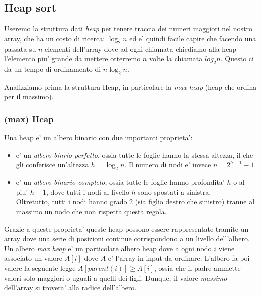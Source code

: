 \documentclass{article}
\begin{document}
\subsection{Heap sort}

Useremo la struttura dati \emph{heap} per tenere traccia dei numeri maggiori nel
nostro array, che ha un costo di ricerca: $\log_2 n$ ed e' quindi facile capire
che facendo una passata su $n$ elementi dell'array dove ad ogni chiamata chiediamo
alla heap l'elemento piu' grande da mettere otterremo $n$ volte la chiamata $log_2 n$.
Questo ci da un tempo di ordinamento di $n \log_2 n$.

Analizziamo prima la struttura Heap, in particolare la \emph{max heap} (heap che
ordina per il massimo).

\subsubsection{(max) Heap}

Una heap e' un albero binario con due importanti proprieta':
\begin{itemize}
  \item e' un \emph{albero binrio perfetto}, ossia tutte le foglie hanno la
    stessa altezza, il che gli conferisce un'altezza $h = \log_2 n$. Il numero
    di nodi e' invece $n = 2^{h+1}-1$.
  \item e' un \emph{albero binario completo}, ossia tutte le foglie hanno profondita'
    $h$ o al piu' $h-1$, dove tutti i nodi al livello $h$ sono spostati a sinistra. \\
    Oltretutto, tutti i nodi hanno grado 2 (sia figlio destro che sinistro) tranne
    al massimo un nodo che non rispetta questa regola.
\end{itemize}

Grazie a queste proprieta' queste heap possono essere rappresentate tramite un
array dove una serie di posizioni continue corrispondono a un livello dell'albero. \\

Un albero \emph{max heap} e' un particolare albero heap dove a ogni nodo $i$ viene
associato un valore $A[i]$ dove $A$ e' l'array in input da ordinare. L'albero
fa poi valere la seguente legge $A[parent(i)] \geq A[i]$, ossia che il padre
ammette valori solo maggiori o uguali a quelli dei figli. Dunque, il valore
\emph{massimo} dell'array si trovera' alla radice dell'albero.
\end{document}
